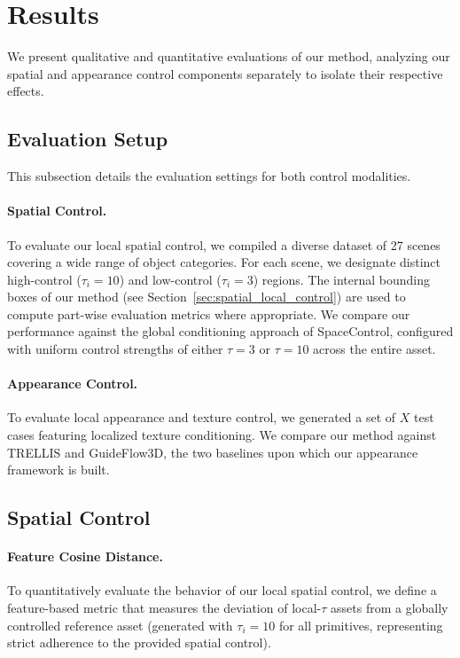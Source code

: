 \section{Results}
We present qualitative and quantitative evaluations of our method, analyzing our spatial and appearance control components separately to isolate their respective effects.

\subsection{Evaluation Setup}
This subsection details the evaluation settings for both control modalities.
\paragraph{Spatial Control.}
To evaluate our local spatial control, we compiled a diverse dataset of 27 scenes covering a wide range of object categories. For each scene, we designate distinct high-control ($\tau_i = 10$) and low-control ($\tau_i = 3$) regions. The internal bounding boxes of our method (see Section~\ref{sec:spatial_local_control}) are used to compute part-wise evaluation metrics where appropriate. We compare our performance against the global conditioning approach of SpaceControl, configured with uniform control strengths of either $\tau = 3$ or $\tau = 10$ across the entire asset.

\paragraph{Appearance Control.}
To evaluate local appearance and texture control, we generated a set of $X$ test cases featuring localized texture conditioning. We compare our method against TRELLIS and GuideFlow3D, the two baselines upon which our appearance framework is built.

\subsection{Spatial Control}

\paragraph{Feature Cosine Distance.}
To quantitatively evaluate the behavior of our local spatial control, we define a feature-based metric that measures the deviation of local-$\tau$ assets from a globally controlled reference asset (generated with $\tau_i = 10$ for all primitives, representing strict adherence to the provided spatial control). 

